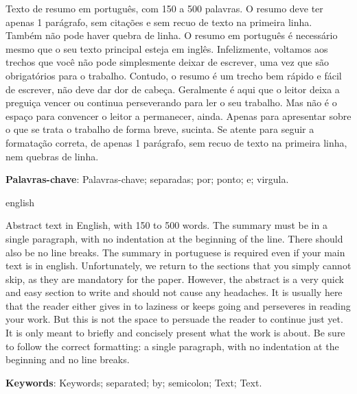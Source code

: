 
\begin{resumo}[Resumo] 
\noindent Texto de resumo em português, com 150 a 500 palavras. O resumo deve ter apenas 1 parágrafo, sem citações e sem recuo de texto na primeira linha. Também não pode haver quebra de linha. O resumo em português é necessário mesmo que o seu texto principal esteja em inglês. Infelizmente, voltamos aos trechos que você não pode simplesmente deixar de escrever, uma vez que são obrigatórios para o trabalho. Contudo, o resumo é um trecho bem rápido e fácil de escrever, não deve dar dor de cabeça. Geralmente é aqui que o leitor deixa a preguiça vencer ou continua perseverando para ler o seu trabalho. Mas não é o espaço para convencer o leitor a permanecer, ainda. Apenas para apresentar sobre o que se trata o trabalho de forma breve, sucinta. Se atente para seguir a formatação correta, de apenas 1 parágrafo, sem recuo de texto na primeira linha, nem quebras de linha.

 \vspace{\onelineskip}
    
 \noindent
 \textbf{Palavras-chave}: Palavras-chave; separadas; por; ponto; e; virgula.
\end{resumo}



\begin{resumo}[Abstract]
\begin{otherlanguage*}{english}

\noindent Abstract text in English, with 150 to 500 words. The summary must be in a single paragraph, with no indentation at the beginning of the line. There should also be no line breaks. The summary in portuguese is required even if your main text is in english. Unfortunately, we return to the sections that you simply cannot skip, as they are mandatory for the paper. However, the abstract is a very quick and easy section to write and should not cause any headaches. It is usually here that the reader either gives in to laziness or keeps going and perseveres in reading your work. But this is not the space to persuade the reader to continue just yet. It is only meant to briefly and concisely present what the work is about. Be sure to follow the correct formatting: a single paragraph, with no indentation at the beginning and no line breaks.

   \vspace{\onelineskip} 
 
   \noindent 
      \textbf{Keywords}: Keywords; separated; by; semicolon; Text; Text.

  \end{otherlanguage*}
 \end{resumo}
